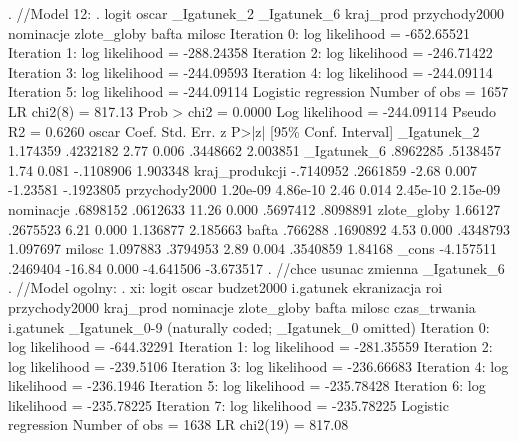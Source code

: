\vspace{1cm}
\begin{stlog}

. //Model 12:
. logit oscar _Igatunek_2 _Igatunek_6 kraj_prod przychody2000 nominacje zlote_globy bafta milosc
{\smallskip}
Iteration 0:   log likelihood = -652.65521  
Iteration 1:   log likelihood = -288.24358  
Iteration 2:   log likelihood = -246.71422  
Iteration 3:   log likelihood = -244.09593  
Iteration 4:   log likelihood = -244.09114  
Iteration 5:   log likelihood = -244.09114  
{\smallskip}
Logistic regression                               Number of obs   =       1657
                                                  LR chi2(8)      =     817.13
                                                  Prob > chi2     =     0.0000
Log likelihood = -244.09114                       Pseudo R2       =     0.6260
{\smallskip}
         oscar {\VBAR}      Coef.   Std. Err.      z    P>|z|     [95\% Conf. Interval]
   _Igatunek_2 {\VBAR}   1.174359   .4232182     2.77   0.006     .3448662    2.003851
   _Igatunek_6 {\VBAR}   .8962285   .5138457     1.74   0.081    -.1108906    1.903348
kraj_produkcji {\VBAR}  -.7140952   .2661859    -2.68   0.007     -1.23581   -.1923805
 przychody2000 {\VBAR}   1.20e-09   4.86e-10     2.46   0.014     2.45e-10    2.15e-09
     nominacje {\VBAR}   .6898152   .0612633    11.26   0.000     .5697412    .8098891
   zlote_globy {\VBAR}    1.66127   .2675523     6.21   0.000     1.136877    2.185663
         bafta {\VBAR}    .766288   .1690892     4.53   0.000     .4348793    1.097697
        milosc {\VBAR}   1.097883   .3794953     2.89   0.004     .3540859     1.84168
         _cons {\VBAR}  -4.157511   .2469404   -16.84   0.000    -4.641506   -3.673517
{\smallskip}
. //chce usunac zmienna _Igatunek_6
. //Model ogolny:
. xi: logit oscar  budzet2000 i.gatunek ekranizacja roi przychody2000 kraj_prod nominacje zlote_globy bafta
 milosc czas_trwania
i.gatunek         _Igatunek_0-9       (naturally coded; _Igatunek_0 omitted)
{\smallskip}
Iteration 0:   log likelihood = -644.32291  
Iteration 1:   log likelihood = -281.35559  
Iteration 2:   log likelihood =  -239.5106  
Iteration 3:   log likelihood = -236.66683  
Iteration 4:   log likelihood =  -236.1946  
Iteration 5:   log likelihood = -235.78428  
Iteration 6:   log likelihood = -235.78225  
Iteration 7:   log likelihood = -235.78225  
{\smallskip}
Logistic regression                               Number of obs   =       1638
                                                  LR chi2(19)     =     817.08

\end{stlog}
